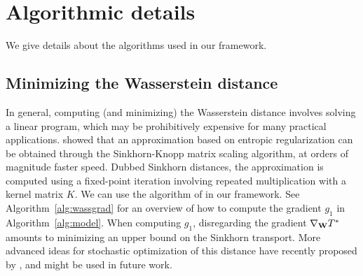 \section{Algorithmic details}\label{sec:appmodel}

We give details about the algorithms used in our framework. 

%

\subsection{Minimizing the Wasserstein distance}
In general, computing (and minimizing) the Wasserstein distance involves solving a linear program, which may be prohibitively expensive for many practical applications. \citet{cuturi2013sinkhorn} showed that an approximation based on entropic regularization can be obtained through the Sinkhorn-Knopp matrix scaling algorithm, at orders of magnitude faster speed. Dubbed Sinkhorn distances, the approximation is computed using a fixed-point iteration involving repeated multiplication with a kernel matrix $K$. We can use the algorithm of \citet{cuturi2013sinkhorn} in our framework. See Algorithm~\ref{alg:wassgrad} for an overview of how to compute the gradient $g_1$ in Algorithm~\ref{alg:model}. When computing $g_1$, disregarding the gradient $\nabla_{\bf W} T^*$ amounts to minimizing an upper bound on the Sinkhorn transport. More advanced ideas for stochastic optimization of this distance have recently proposed by \citet{aude2016stochastic}, and might be used in future work.

